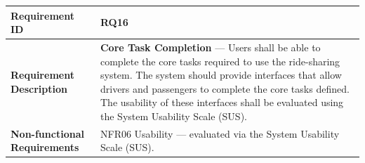 \begin{minipage}{\textwidth}
\small
\begin{tabular}{|>{\raggedright\arraybackslash}p{}|>{\raggedright\arraybackslash}p{}|}
\hline
\textbf{Requirement ID} & RQ16 \\
\hline
\textbf{Requirement Description} & \textbf{Core Task Completion} --- Users shall be able to complete the core tasks required to use the ride-sharing system. The system should provide interfaces that allow drivers and passengers to complete the core tasks defined. The usability of these interfaces shall be evaluated using the System Usability Scale (SUS). \\
\hline
\textbf{Non-functional Requirements} & NFR06 Usability --- evaluated via the System Usability Scale (SUS). \\
\hline
\end{tabular}
\end{minipage}
\medskip
